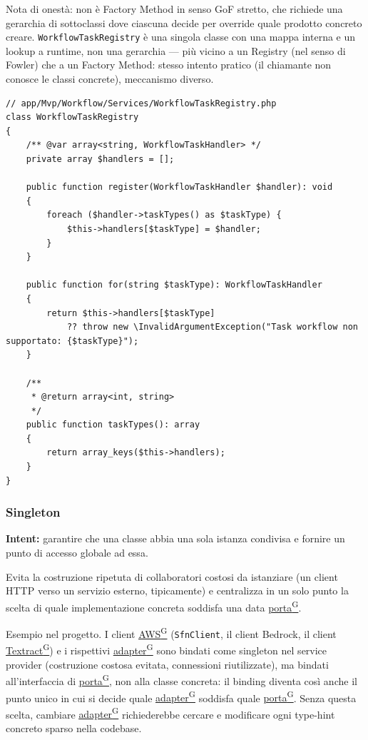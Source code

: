 \documentclass[a4paper,12pt]{article}
\providecommand{\glslink}[2]{\href{https://alittlebyte-19.github.io/Documentazione/glossario.html\#gls-#1}{\underline{#2}\textsuperscript{\scriptsize G}}}
\begin{document}
\begin{sloppypar}
Nota di onestà: non è Factory Method in senso GoF stretto, che richiede una gerarchia di sottoclassi dove ciascuna decide per override quale prodotto concreto creare. \texttt{WorkflowTaskRegistry} è una singola classe con una mappa interna e un lookup a runtime, non una gerarchia — più vicino a un Registry (nel senso di Fowler) che a un Factory Method: stesso intento pratico (il chiamante non conosce le classi concrete), meccanismo diverso.

\begin{lstlisting}[style=phplisting, caption={WorkflowTaskRegistry -- registrazione e lookup dell'handler per tipo di task}]
// app/Mvp/Workflow/Services/WorkflowTaskRegistry.php
class WorkflowTaskRegistry
{
    /** @var array<string, WorkflowTaskHandler> */
    private array $handlers = [];

    public function register(WorkflowTaskHandler $handler): void
    {
        foreach ($handler->taskTypes() as $taskType) {
            $this->handlers[$taskType] = $handler;
        }
    }

    public function for(string $taskType): WorkflowTaskHandler
    {
        return $this->handlers[$taskType]
            ?? throw new \InvalidArgumentException("Task workflow non supportato: {$taskType}");
    }

    /**
     * @return array<int, string>
     */
    public function taskTypes(): array
    {
        return array_keys($this->handlers);
    }
}
\end{lstlisting}

\subsubsection{Singleton}

\textbf{Intent:} garantire che una classe abbia una sola istanza condivisa e fornire un punto di accesso globale ad essa.

Evita la costruzione ripetuta di collaboratori costosi da istanziare (un client HTTP verso un servizio esterno, tipicamente) e centralizza in un solo punto la scelta di quale implementazione concreta soddisfa una data \glslink{porta}{porta}.

Esempio nel progetto. I client \glslink{aws}{AWS} (\texttt{SfnClient}, il client Bedrock, il client \glslink{textract}{Textract}) e i rispettivi \glslink{adapter}{adapter} sono bindati come singleton nel service provider (costruzione costosa evitata, connessioni riutilizzate), ma bindati all'interfaccia di \glslink{porta}{porta}, non alla classe concreta: il binding diventa così anche il punto unico in cui si decide quale \glslink{adapter}{adapter} soddisfa quale \glslink{porta}{porta}. Senza questa scelta, cambiare \glslink{adapter}{adapter} richiederebbe cercare e modificare ogni type-hint concreto sparso nella codebase.


\end{sloppypar}
\end{document}
